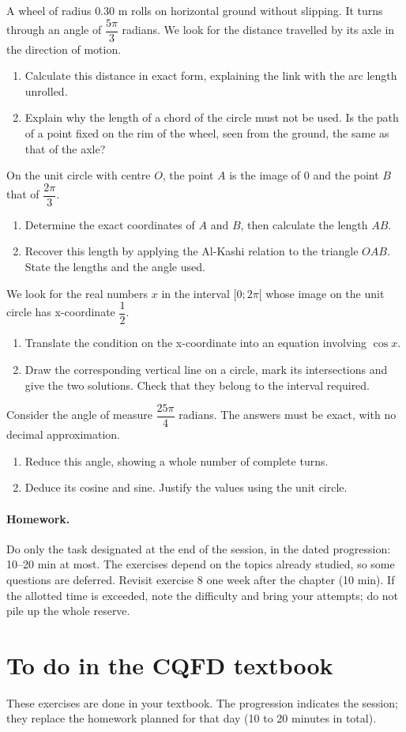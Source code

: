 A wheel of radius $0.30$ m rolls on horizontal ground without slipping. It turns through an angle of $\dfrac{5\pi}{3}$ radians. We look for the distance travelled by its axle in the direction of motion.
\begin{enumerate}[label=\arabic*.]
\item Calculate this distance in exact form, explaining the link with the arc length unrolled.
\item Explain why the length of a chord of the circle must not be used. Is the path of a point fixed on the rim of the wheel, seen from the ground, the same as that of the axle?
\end{enumerate}
On the unit circle with centre $O$, the point $A$ is the image of 0 and the point $B$ that of $\dfrac{2\pi}{3}$.
\begin{enumerate}[label=\arabic*.]
\item Determine the exact coordinates of $A$ and $B$, then calculate the length $AB$.
\item Recover this length by applying the Al-Kashi relation to the triangle $OAB$. State the lengths and the angle used.
\end{enumerate}
We look for the real numbers $x$ in the interval $[0;2\pi[$ whose image on the unit circle has x-coordinate $\dfrac12$.
\begin{enumerate}[label=\arabic*.]
\item Translate the condition on the x-coordinate into an equation involving $\cos x$.
\item Draw the corresponding vertical line on a circle, mark its intersections and give the two solutions. Check that they belong to the interval required.
\end{enumerate}
Consider the angle of measure $\dfrac{25\pi}{4}$ radians. The answers must be exact, with no decimal approximation.
\begin{enumerate}[label=\arabic*.]
\item Reduce this angle, showing a whole number of complete turns.
\item Deduce its cosine and sine. Justify the values using the unit circle.
\end{enumerate}
\paragraph{Homework.} Do only the task designated at the end of the session, in the dated progression: 10--20 min at most. The exercises depend on the topics already studied, so some questions are deferred. Revisit exercise 8 one week after the chapter (10 min). If the allotted time is exceeded, note the difficulty and bring your attempts; do not pile up the whole reserve.
\endgroup
{}\section*{To do in the CQFD textbook}
These exercises are done in your textbook. The progression indicates the session; they replace the homework planned for that day (10 to 20 minutes in total).
